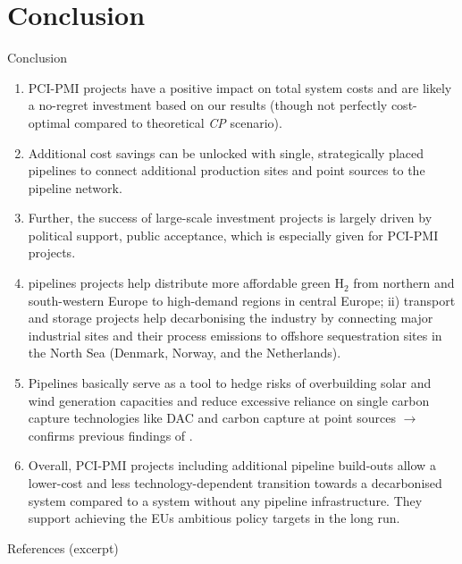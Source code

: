 \documentclass[10pt,aspectratio=169,dvipsnames]{beamer}
\begin{document}
\section{Conclusion}
\begin{frame}{Conclusion}
  \footnotesize
  \begin{enumerate}
    \setlength\itemsep{0.3em}
    \item PCI-PMI projects have a positive impact on total system costs and are likely a no-regret investment based on our results (though not perfectly cost-optimal compared to theoretical \textit{CP} scenario).
    \item Additional cost savings can be unlocked with single, strategically placed pipelines to connect additional  production sites and  point sources to the pipeline network.
    \item Further, the success of large-scale investment projects is largely driven by political support, public acceptance, which is especially given for PCI-PMI projects.
    \item {} pipelines projects help distribute more affordable green H$_2$ from northern and south-western Europe to high-demand regions in central Europe; ii)  transport and storage projects help decarbonising the industry by connecting major industrial sites and their process emissions to offshore sequestration sites in the North Sea (Denmark, Norway, and the Netherlands).
    \item Pipelines basically serve as a tool to hedge risks of overbuilding solar and wind generation capacities and reduce excessive reliance on single carbon capture technologies like DAC and carbon capture at point sources $\rightarrow$ confirms previous findings of \cite{hofmannH2CO2Network2025}.
    \item Overall, PCI-PMI projects including additional pipeline build-outs allow a lower-cost and less technology-dependent transition towards a decarbonised system compared to a system without any pipeline infrastructure. They support achieving the EUs ambitious policy targets in the long run.
  \end{enumerate}

\end{frame}


\begin{frame}{References (excerpt)}
  \begingroup
  \renewcommand*{\bibfont}{\scriptsize}
  \printbibliography
  \endgroup
\end{frame}
\end{document}
